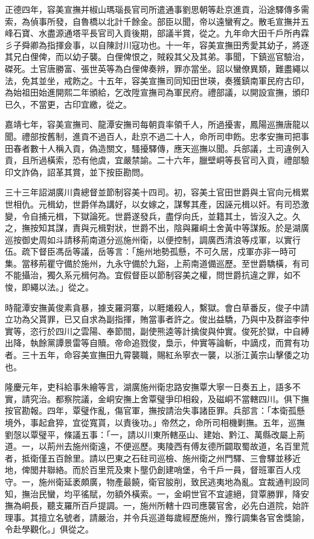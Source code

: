 \begin{pinyinscope}
正德四年，容美宣撫并椒山瑪瑙長官司所遣通事劉思朝等赴京進貢，沿途驛傳多需索，為偵事所發，自魯橋以北計千餘金。部臣以聞，帝以遠蠻宥之。散毛宣撫并五峰石寶、水盡源通塔平長官司入貢後期，部議半賞，從之。九年命大田千戶所冉霖彡子舜卿為指揮僉事，以自陳討川寇功也。十一年，容美宣撫田秀愛其幼子，將逐其兄白俚俾，而以幼子襲。白俚俾恨之，賊殺其父及其弟。事聞，下鎮巡官驗治，磔死。土官唐勝富、張世英等為白俚俾奏辨，罪亦當坐。詔以蠻僚異類，難盡繩以法，免其並坐，戒飭之。十五年，容美宣撫司同知田世瑛，奏獲鎮南軍民府古印，為始祖田始進開熙二年頒給，乞改陞宣撫司為軍民府。禮部議，以開設宣撫，頒印已久，不當更，古印宜繳，從之。

嘉靖七年，容美宣撫司、龍潭安撫司每朝貢率領千人，所過擾害，鳳陽巡撫唐龍以聞。禮部按舊制，進貢不過百人，赴京不過二十人，命所司申飭。忠孝安撫司把事田春者數十人稱入貢，偽造關文，騷擾驛傳，應天巡撫以聞。兵部議，土司違例入貢，且所過橫索，恐有他虞，宜嚴禁諭。二十六年，臘壁峒等長官司入貢，禮部驗印文詐偽，詔革其賞，並下按臣勘問。

三十三年詔湖廣川貴總督並節制容美十四司。初，容美土官田世爵與土官向元楫累世相仇。元楫幼，世爵佯為講好，以女嫁之，謀奪其產，因誣元楫以奸。有司恐激變，令自捕元楫，下獄論死。世爵遂發兵，盡俘向氏，並籍其土，皆沒入之。久之，撫按知其謀，責與元楫對狀，世爵不出，陰與羅峒土舍黃中等謀叛。於是湖廣巡按御史周如斗請移荊南道分巡施州衛，以便控制，調廣西清浪等戍軍，以實行伍。疏下督臣馮岳等議，岳等言：「施州地勢孤懸，不可久居，戍軍亦非一時可集。當移荊瞿守備於施州，九永守備於九谿，上荊南道備巡歷。至世爵驕橫，有司不能攝治，獨久系元楫何為。宜假督臣以節制容美之權，問世爵抗違之罪，如不悛，即繩以法。」從之。

時龍潭安撫黃俊素貪暴，據支羅洞寨，以睚爔殺人，繫獄。會白草番反，俊子中請立功為父貰罪，已又自求為副指揮，賄當事者許之。俊出益驕，乃與中及群盜李仲實等，恣行於四川之雲陽、奉節間，副使熊逵等計擒俊與仲實。俊死於獄，中自縛出降，執餘黨譚景雷等自贖。帝命追戮俊，梟示，仲實等論斬，中謫戍，而賞有功者。三十五年，命容美宣撫田九霄襲職，賜紅糸寧衣一襲，以浙江黃宗山擊倭之功也。

隆慶元年，吏科給事朱繪等言，湖廣施州衛忠路安撫覃大寧一日奏五上，語多不實，請究治。都察院議，金峒安撫上舍覃璧爭印相殺，及磁峒不當轄四川。俱下撫按官勘報。四年，覃璧作亂，傷官軍，撫按請治失事諸臣罪。兵部言：「本衛孤懸境外，事起倉猝，宜從寬貰，以責後功。」帝然之，命所司相機剿撫。五年，巡撫劉愨以覃璧平，條議五事：「一，請以川東所轄巫山、建始、黔江、萬縣改屬上荊道。一，以荊州去施州衛遠，不便巡歷。夷陵西有傅友德所闢取蜀故道，名百里荒者，抵衛僅五百餘里。請以巴東之石砫司巡檢、施州衛之州門驛、三會驛並移近地，俾閭井聯絡。而於百里荒及東卜壟仍創建哨堡，令千戶一員，督班軍百人戍守。一，施州衛延袤頗廣，物產最饒，衛官朘削，致民逃夷地為亂。宜裁通判設同知，撫治民蠻，均平徭賦，勿額外橫索。一，金峒世官不宜遽絕，貸覃勝罪，降安撫為峒長，聽支羅所百戶提調。一，施州所轄十四司應襲官舍，必先白道院，始許理事。其擅立名號者，請嚴治，并令兵巡道每歲經歷施州，豫行調集各官舍獎諭，令赴學觀化。」俱從之。


\end{pinyinscope}
